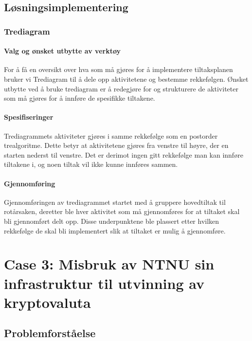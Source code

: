 \subsection{Løsningsimplementering}

\subsubsection{Trediagram}

\paragraph{Valg og ønsket utbytte av verktøy}
For å få en oversikt over hva som må gjøres for å implementere tiltaksplanen bruker vi Trediagram til å dele opp aktivitetene og bestemme rekkefølgen. Ønsket utbytte ved å bruke trediagram er å redegjøre for og strukturere de aktiviteter som må gjøres for å innføre de spesifikke tiltakene. 

\paragraph{Spesifiseringer}
Trediagrammets aktiviteter gjøres i samme rekkefølge som en postorder trealgoritme. Dette betyr at aktivitetene gjøres fra venstre til høyre, der en starten nederst til venstre. Det er derimot ingen gitt rekkefølge man kan innføre tiltakene i, og noen tiltak vil ikke kunne innføres sammen. 

\paragraph{Gjennomføring}
Gjennomføringen av trediagrammet startet med å gruppere hovedtiltak til rotårsaken, deretter ble hver aktivitet som må gjennomføres for at tiltaket skal bli gjennomført delt opp. Disse underpunktene ble plassert etter hvilken rekkefølge de skal bli implementert slik at tiltaket er mulig å gjennomføre. 


\newpage
\section{Case 3: Misbruk av NTNU sin infrastruktur til utvinning av kryptovaluta}

\subsection{Problemforståelse}

